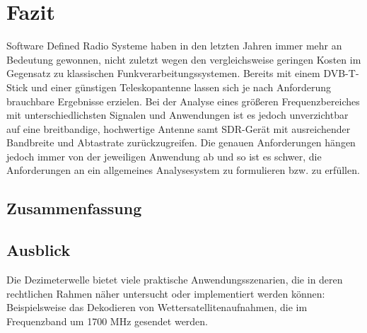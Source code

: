 
\chapter{Fazit}
Software Defined Radio Systeme haben in den letzten Jahren immer mehr an Bedeutung gewonnen, nicht zuletzt wegen den vergleichsweise geringen Kosten im Gegensatz zu klassischen Funkverarbeitungssystemen.
Bereits mit einem DVB-T-Stick und einer günstigen Teleskopantenne lassen sich je nach Anforderung brauchbare Ergebnisse erzielen. Bei der Analyse eines größeren Frequenzbereiches mit unterschiedlichsten Signalen und Anwendungen ist es jedoch unverzichtbar auf eine breitbandige, hochwertige Antenne samt SDR-Gerät mit ausreichender Bandbreite und Abtastrate zurückzugreifen. Die genauen Anforderungen hängen jedoch immer von der jeweiligen Anwendung ab und so ist es schwer, die Anforderungen an ein allgemeines Analysesystem zu formulieren bzw. zu erfüllen.



\section{Zusammenfassung}



\section{Ausblick}
Die Dezimeterwelle bietet viele praktische Anwendungsszenarien, die in deren rechtlichen Rahmen näher untersucht oder implementiert werden können:
Beispielsweise das Dekodieren von Wettersatellitenaufnahmen, die im Frequenzband um 1700 MHz gesendet werden. 